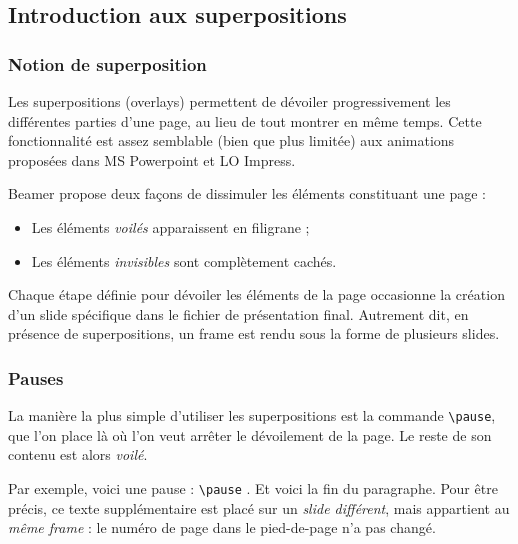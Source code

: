 \documentclass[10pt,    %
    french,             %
    xcolor=table,       %
    envcountsect,       %
    aspectratio=43      %
]{beamer}
\begin{document}
\subsection{Introduction aux superpositions}
\begin{frame}
    \frametitle{Notion de superposition}
    
    Les superpositions (overlays) permettent de dévoiler progressivement les différentes parties d'une page, au lieu de tout montrer en même temps. Cette fonctionnalité est assez semblable (bien que plus limitée) aux animations proposées dans MS Powerpoint et LO Impress.
    
    \vspace{0.25cm}
    Beamer propose deux façons de dissimuler les éléments constituant une page : 
    \begin{itemize}
        \item Les éléments \textit{voilés} apparaissent en filigrane ;
        \item Les éléments \textit{invisibles} sont complètement cachés.
    \end{itemize}
    
    \vspace{0.25cm}
    Chaque étape définie pour dévoiler les éléments de la page occasionne la création d'un slide spécifique dans le fichier de présentation final. Autrement dit, en présence de superpositions, un frame est rendu sous la forme de plusieurs slides.
    
\end{frame}

\begin{frame}
    \frametitle{Pauses}
    
    La manière la plus simple d'utiliser les superpositions est la commande \texttt{\textbackslash{}pause}, que l'on place là où l'on veut arrêter le dévoilement de la page. Le reste de son contenu est alors \textit{voilé}.
    
    \vspace{0.25cm}
    Par exemple, voici une pause : \texttt{\textbackslash{}pause} \pause. Et voici la fin du paragraphe. Pour être précis, ce texte supplémentaire est placé sur un \textit{slide différent}, mais appartient au \textit{même frame} : le numéro de page dans le pied-de-page n'a pas changé.
    
    \vspace{0.25cm}
\end{frame}
\end{document}
